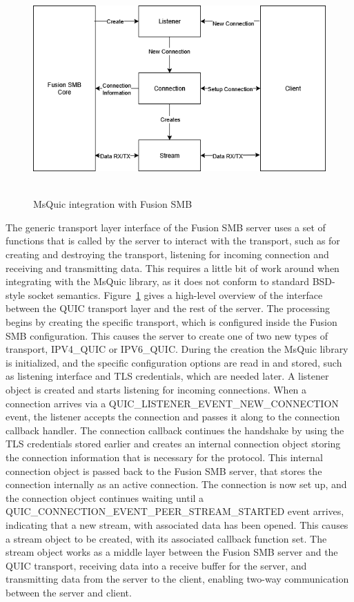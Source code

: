 \documentclass[english, 12pt, a4paper, elec, utf8, a-2b, online]{aaltothesis}
\begin{document}
\begin{figure}[h]
	\centering
	\includegraphics[alt={Block diagram of the flow between Fusion SMB and MsQuic}, height=7.4cm]{./images/MsQuic_integration.png}
	\caption{MsQuic integration with Fusion SMB}
	\label{fig:msquic_int}
\end{figure}

The generic transport layer interface of the Fusion SMB server uses a set of functions
that is called by the server to interact with the transport, such as for creating and
destroying the transport, listening for incoming connection and receiving and transmitting data.
This requires a little bit of work around when integrating with the MsQuic library, as
it does not conform to standard BSD-style socket semantics. Figure~\ref{fig:msquic_int}
gives a high-level overview of the interface between the QUIC transport layer and the
rest of the server. The processing begins by creating the specific transport, which
is configured inside the Fusion SMB configuration. This causes the server to create
one of two new types of transport, IPV4\_QUIC or IPV6\_QUIC. During the creation the MsQuic
library is initialized, and the specific configuration options are read in and stored,
such as listening interface and TLS credentials, which are needed later. A listener
object is created and starts listening for incoming connections. When a connection
arrives via a QUIC\_LISTENER\_EVENT\_NEW\_CONNECTION event, the listener accepts the
connection and passes it along to the
connection callback handler. The connection callback continues the handshake by using the TLS
credentials stored earlier and creates an internal connection object storing
the connection information that is necessary for the protocol. This internal connection
object is passed back to the Fusion SMB server, that stores the connection internally
as an active connection. The connection is now set up, and the connection object continues waiting
until a QUIC\_CONNECTION\_EVENT\_PEER\_STREAM\_STARTED event arrives, indicating
that a new stream, with associated data has been opened. This causes a stream object
to be created, with its associated callback function set. The stream object works
as a middle layer between the Fusion SMB server and the QUIC transport, receiving
data into a receive buffer for the server, and transmitting data from the server to
the client, enabling two-way communication between the server and client.
\end{document}
